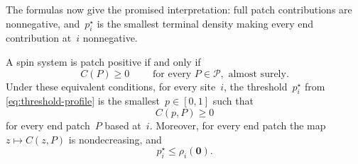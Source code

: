 \documentclass[EJP,preprint,NODS,nobera]{ejpecp}
\newcommand{\mb}[1]{\mathbf{#1}}
\newcommand{\rev}[1]{{\color{red}#1}}
\begin{document}
{\color{red}
The formulas now give the promised interpretation: full patch contributions are nonnegative, and~$p_i^\star$ is the smallest terminal density making every end contribution at~$i$ nonnegative.
}

\begin{proposition}
\label{prop:patch-contribution-positivity}
A spin system is patch positive if and only if
\begin{equation*}
C(P)\geq0 \qquad \text{ for every }P\in\mathcal{P}, \text{ almost surely.}
\end{equation*}
\rev{Under these equivalent conditions,} for every site~$i$, the threshold~$p_i^\star$ from
\eqref{eq:threshold-profile} is the smallest~$p\in[0,1]$ such that
\begin{equation*}
C(p,P)\geq0
\end{equation*}
for every end patch~$P$ based at~$i$. Moreover, for every end patch the map~$z\mapsto C(z,P)$ is nondecreasing, and
\begin{equation}
\label{eq:threshold-below-zero-neighbour-refresh}
p_i^\star\leq\rho_i(\mb 0).
\end{equation}
\end{proposition}
\end{document}
